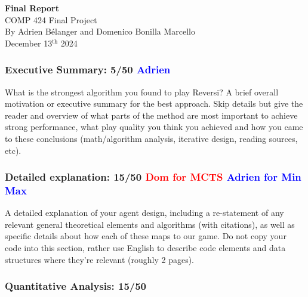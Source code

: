 \documentclass[12pt, letterpaper]{article}
\begin{document}
\begin{titlepage}
    \centering
    \vspace*{2in}
    {\LARGE \textbf{Final Report}}\\
    \vspace*{0.5in}
    {\large COMP 424 Final Project}\\[4in]
    \normalsize
    By Adrien Bélanger and Domenico Bonilla Marcello \\ [3em]
    December 13$^{\text{th}}$ 2024
\end{titlepage}

\subsubsection*{Executive Summary: 5/50 \textcolor{blue}{Adrien}}
    
    What is the strongest algorithm you found to play Reversi? 
    A brief overall motivation or executive summary for the best approach. 
    Skip details but give the reader and overview of what parts of 
    the method are most important to achieve strong performance, 
    what play quality you think you achieved and how you came to 
    these conclusions (math/algorithm analysis, iterative design, 
    reading sources, etc).
    



\subsubsection*{Detailed explanation: 15/50 \textcolor{red}{Dom for MCTS} \textcolor{blue}{Adrien for Min Max}}
    
    A detailed explanation of your agent design, including a re-statement of any relevant general 
    theoretical elements and algorithms (with citations), as well as specific details about
    how each of these maps to our game. Do not copy your code into this section, 
    rather use English to describe code elements and data structures where they're 
    relevant  (roughly 2 pages). 
    

\subsubsection*{Quantitative Analysis: 15/50}
    
\end{document}
